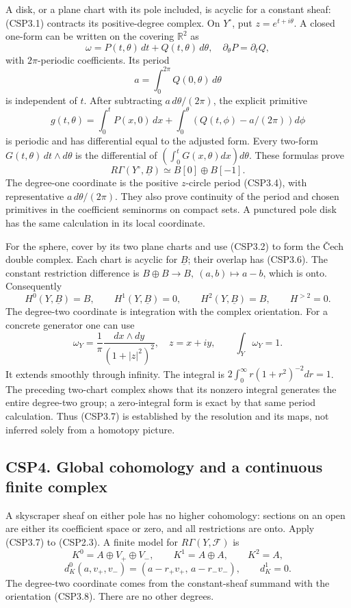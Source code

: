 A disk, or a plane chart with its pole included, is acyclic for a
constant sheaf: (CSP3.1) contracts its positive-degree complex. On
\(Y^\circ\), put \(z=e^{t+i\theta}\). A closed one-form can be written
on the covering \(\mathbb R^2\) as \[
\omega=P(t,\theta)\,dt+Q(t,\theta)\,d\theta,
\quad
\partial_\theta P=\partial_tQ,
\] with \(2\pi\)-periodic coefficients. Its period \[
a=\int_0^{2\pi}Q(0,\theta)\,d\theta
\tag{CSP3.4}
\] is independent of \(t\). After subtracting \(a\,d\theta/(2\pi)\), the
explicit primitive \[
g(t,\theta)=
\int_0^tP(x,0)\,dx+
\int_0^\theta\left(Q(t,\phi)-a/(2\pi)\right)d\phi
\tag{CSP3.5}
\] is periodic and has differential equal to the adjusted form. Every
two-form \(G(t,\theta)\,dt\wedge d\theta\) is the differential of
\((\int_0^tG(x,\theta)dx)d\theta\). These formulas prove \[
R\Gamma(Y^\circ,\underline B)
\simeq B[0]\oplus B[-1].
\tag{CSP3.6}
\] The degree-one coordinate is the positive \(z\)-circle period
(CSP3.4), with representative \(a\,d\theta/(2\pi)\). They also prove
continuity of the period and chosen primitives in the coefficient
seminorms on compact sets. A punctured pole disk has the same
calculation in its local coordinate.

For the sphere, cover by its two plane charts and use (CSP3.2) to form
the Čech double complex. Each chart is acyclic for \(\underline B\);
their overlap has (CSP3.6). The constant restriction difference is
\(B\oplus B\to B,\ (a,b)\mapsto a-b\), which is onto. Consequently \[
H^0(Y,\underline B)=B,\qquad
H^1(Y,\underline B)=0,\qquad
H^2(Y,\underline B)=B,\qquad H^{>2}=0.
\tag{CSP3.7}
\] The degree-two coordinate is integration with the complex
orientation. For a concrete generator one can use \[
\omega_Y=\frac1\pi\frac{dx\wedge dy}{(1+|z|^2)^2},
\quad z=x+iy,\qquad \int_Y\omega_Y=1.
\tag{CSP3.8}
\] It extends smoothly through infinity. The integral is
\(2\int_0^\infty r(1+r^2)^{-2}dr=1\). The preceding two-chart complex
shows that its nonzero integral generates the entire degree-two group; a
zero-integral form is exact by that same period calculation. Thus
(CSP3.7) is established by the resolution and its maps, not inferred
solely from a homotopy picture.

\subsection{CSP4. Global cohomology and a continuous finite
complex}\label{csp4.-global-cohomology-and-a-continuous-finite-complex}

A skyscraper sheaf on either pole has no higher cohomology: sections on
an open are either its coefficient space or zero, and all restrictions
are onto. Apply (CSP3.7) to (CSP2.3). A finite model for
\(R\Gamma(Y,\mathscr F)\) is \[
K^0=A\oplus V_+\oplus V_-,\qquad
K^1=A\oplus A,\qquad K^2=A,
\] \[
d_K^0(a,v_+,v_-)=
(a-r_+v_+,\,a-r_-v_-),\qquad d_K^1=0.
\tag{CSP4.1}
\] The degree-two coordinate comes from the constant-sheaf summand with
the orientation (CSP3.8). There are no other degrees.

